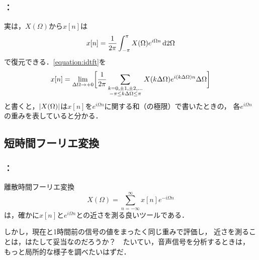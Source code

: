 \documentclass[unicode,11pt]{beamer}
\DeclarePairedDelimiter{\bqty}{\lbrack}{\rbrack}
\DeclarePairedDelimiter{\abs}{\lvert}{\rvert}
\newcommand{\intd}[1]{\dl2#1}
\begin{document}
\begin{frame}
  \frametitle{\secname ：\subsecname}
  実は，\(X(\Omega)\)から\(x[n]\)は
  \begin{equation}
    \label{equation:idtft}
    x[n] = \frac{1}{2\pi}\int_{-\pi}^{\pi}X(\Omega)e^{i\Omega n}\intd{\Omega}
  \end{equation}
  で復元できる．\cref{equation:idtft}を
  \[
    x[n] = \lim_{\Delta\Omega\to +0}\bqty[\bigg]{\frac{1}{2\pi}\sum_{\substack{k=0,\pm 1,\pm 2,\dotsc\\ -\pi\leq k\Delta\Omega\leq\pi}}X(k\Delta\Omega)e^{i(k\Delta\Omega)n}\Delta\Omega}
  \]
  と書くと，\(\abs{X(\Omega)}\)は\(x[n]\)を\(e^{i\Omega n}\)に関する和（の極限）で書いたときの，
  各\(e^{i\Omega n}\)の重みを表していると分かる．
\end{frame}

\subsection{短時間フーリエ変換}
\begin{frame}
  \frametitle{\secname ：\subsecname}
  離散時間フーリエ変換
  \[
    X(\Omega) = \sum_{n=-\infty}^\infty x[n]e^{-i\Omega n}
  \]
  は，確かに\(x[n]\)と\(e^{i\Omega n}\)との近さを測る良いツールである．

  しかし，現在と1時間前の信号の値をまったく同じ重みで評価し，
  近さを測ることは，はたして妥当なのだろうか？　たいてい，音声信号を分析するときは，
  もっと局所的な様子を調べたいはずだ．
\end{frame}
\end{document}
